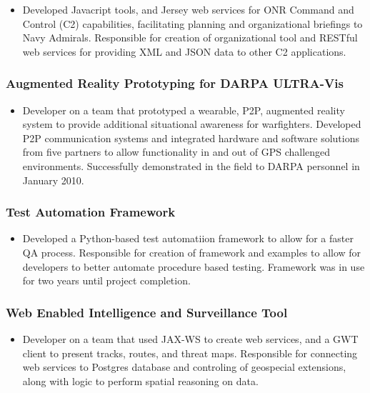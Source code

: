 \documentclass[11pt]{article}
\begin{document}
\begin{itemize}
\item Developed Javacript tools, and Jersey web services for ONR Command and Control (C2) capabilities, facilitating planning and organizational briefings to Navy Admirals. Responsible for creation of organizational tool and RESTful web services for providing XML and JSON data to other C2 applications.
\end{itemize}
\subsubsection*{Augmented Reality Prototyping for DARPA ULTRA-Vis}
\label{sec-1.1.4}

\begin{itemize}
\item Developer on a team that prototyped a wearable, P2P, augmented reality system to provide additional situational awareness for warfighters. Developed P2P communication systems and integrated hardware and software solutions from five partners to allow functionality in and out of GPS challenged environments. Successfully demonstrated in the field to DARPA personnel in January 2010.
\end{itemize}
\subsubsection*{Test Automation Framework}
\label{sec-1.1.5}

\begin{itemize}
\item Developed a Python-based test automatiion framework to allow for a faster QA process. Responsible for creation of framework and examples to allow for developers to better automate procedure based testing. Framework was in use for two years until project completion.
\end{itemize}
\subsubsection*{Web Enabled Intelligence and Surveillance Tool}
\label{sec-1.1.6}

\begin{itemize}
\item Developer on a team that used JAX-WS to create web services, and a GWT client to present tracks, routes, and threat maps. Responsible for connecting web services to Postgres database and controling of geospecial extensions, along with logic to perform spatial reasoning on data.
\end{itemize}
\end{document}
